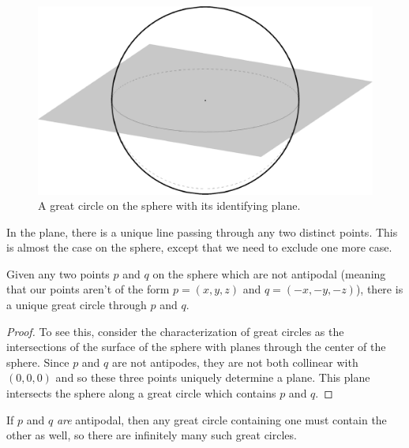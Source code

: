 \ifsmallfigs
\else
\begin{figure}[htb]
	\centering
	\includegraphics[width=.5\textwidth]{figs/sph-1pl.pdf}
	\caption{A great circle on the sphere with its identifying plane.}
	\label{fig:sphereline}
\end{figure}
\fi

In the plane, there is a unique line passing through any two distinct points.  This is almost the case on the sphere, except that we need to exclude one more case.


\begin{observation}
	Given any two points $p$ and $q$ on the sphere which are not antipodal (meaning that our points aren't of the form $p=(x,y,z)$ and $q=(-x,-y,-z)$), there is a unique great circle through $p$ and $q$. 
\end{observation}
\begin{proof}
	To see this, consider the characterization of great circles as the intersections of the surface of the sphere with planes through the center of the sphere.  Since $p$ and $q$ are not antipodes, they are not both collinear with $(0,0,0)$ and so these three points uniquely determine a plane.  This plane intersects the sphere along a great circle which contains $p$ and $q$.
\end{proof}

If $p$ and $q$ \textit{are} antipodal, then any great circle containing one must contain the other as well, so there are infinitely many such great circles.

